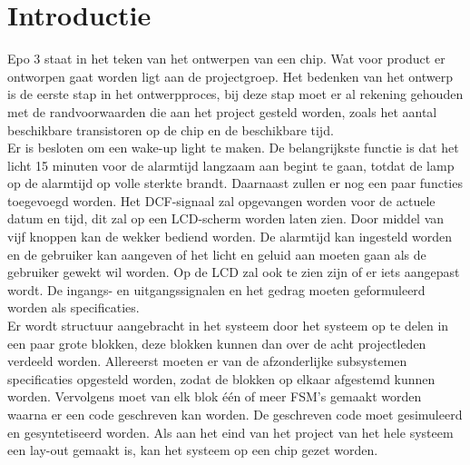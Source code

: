 \chapter{Introductie}
Epo 3 staat in het teken van het ontwerpen van een chip. Wat voor product er ontworpen gaat worden ligt aan de projectgroep. Het bedenken van het ontwerp is de eerste stap in het ontwerpproces, bij deze stap moet er al rekening gehouden met de randvoorwaarden die aan het project gesteld worden, zoals het aantal beschikbare transistoren op de chip en de beschikbare tijd.\\
Er is besloten om een wake-up light te maken. De belangrijkste functie is dat het licht 15 minuten voor de alarmtijd langzaam aan begint te gaan, totdat de lamp op de alarmtijd op volle sterkte brandt. Daarnaast zullen er nog een paar functies toegevoegd worden. Het DCF-signaal zal opgevangen worden voor de actuele datum en tijd, dit zal op een LCD-scherm worden laten zien. Door middel van vijf knoppen kan de wekker bediend worden. De alarmtijd kan ingesteld worden en de gebruiker kan aangeven of het licht en geluid aan moeten gaan als de gebruiker gewekt wil worden. Op de LCD zal ook te zien zijn of er iets aangepast wordt. De ingangs- en uitgangssignalen en het gedrag moeten geformuleerd worden als specificaties.\\
Er wordt structuur aangebracht in het systeem door het systeem op te delen in een paar grote blokken, deze blokken kunnen dan over de acht projectleden verdeeld worden. Allereerst moeten er van de afzonderlijke subsystemen specificaties opgesteld worden, zodat de blokken op elkaar afgestemd kunnen worden. Vervolgens moet van elk blok \'e\'en of meer FSM's gemaakt worden waarna er een code geschreven kan worden. De geschreven code moet gesimuleerd en gesyntetiseerd worden. Als aan het eind van het project van het hele systeem een lay-out gemaakt is, kan het systeem op een chip gezet worden.
